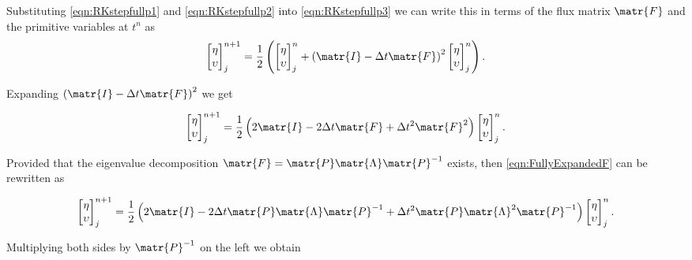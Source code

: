 Substituting \eqref{eqn:RKstepfullp1} and \eqref{eqn:RKstepfullp2} into \eqref{eqn:RKstepfullp3} we can write this in terms of the flux matrix $\matr{F}$ and the primitive variables at $t^n$ as
\begin{equation*}
\begin{bmatrix}
\eta \\ \upsilon
\end{bmatrix}^{n+1}_j = \frac{1}{2} \left(\begin{bmatrix}
\eta \\ \upsilon
\end{bmatrix}^{n}_j + \left(\matr{I} - \Delta t\matr{F} \right)^2 \begin{bmatrix}
\eta \\ \upsilon
\end{bmatrix}^{n}_j\right).
\end{equation*}

Expanding $\left(\matr{I} - \Delta t\matr{F} \right)^2$ we get

\begin{equation}
\label{eqn:FullyExpandedF}
\begin{bmatrix}
\eta \\ \upsilon
\end{bmatrix}^{n+1}_j = \frac{1}{2} \left(2\matr{I}  -2\Delta t\matr{F} + \Delta t^2\matr{F}^2 \right) \begin{bmatrix}
\eta \\ \upsilon
\end{bmatrix}^{n}_j.
\end{equation}

Provided that the eigenvalue decomposition $\matr{F} = \matr{P} \matr{\Lambda} \matr{P}^{-1} $ exists, then \eqref{eqn:FullyExpandedF} can be rewritten as 

\begin{equation*}
\begin{bmatrix}
\eta \\ \upsilon
\end{bmatrix}^{n+1}_j = \frac{1}{2} \left(2\matr{I}  -2\Delta t\matr{P} \matr{\Lambda} \matr{P}^{-1}  + \Delta t^2\matr{P} \matr{\Lambda}^2 \matr{P}^{-1} \right) \begin{bmatrix}
\eta \\ \upsilon
\end{bmatrix}^{n}_j.
\end{equation*}

Multiplying both sides by $\matr{P}^{-1}$ on the left we obtain

